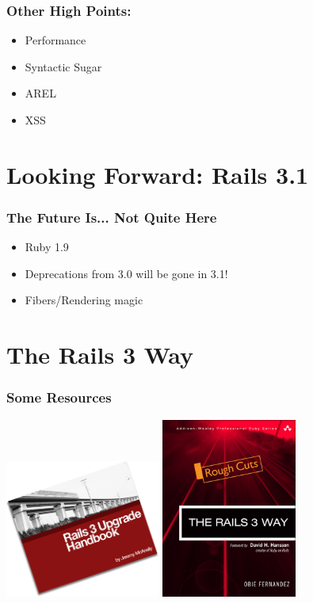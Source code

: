 \documentclass{beamer}
\begin{document}
\begin{frame}
\frametitle{Other High Points:}

\begin{itemize}
\item Performance
\item Syntactic Sugar
\item AREL
\item XSS
\end{itemize}

\end{frame}

\section{Looking Forward: Rails 3.1}
\begin{frame}
\frametitle{The Future Is... Not Quite Here}

\begin{itemize}
\item Ruby 1.9
\pause
\item Deprecations from 3.0 will be gone in 3.1!
\pause
\item Fibers/Rendering magic
\end{itemize}
\end{frame}


\section{The Rails 3 Way}
\begin{frame}
\frametitle{Some Resources}
\includegraphics[width=2in]{rails3upgradehandbook.png}
\includegraphics[width=1.75in]{rails3way.jpeg}  
\end{frame}
\end{document}
